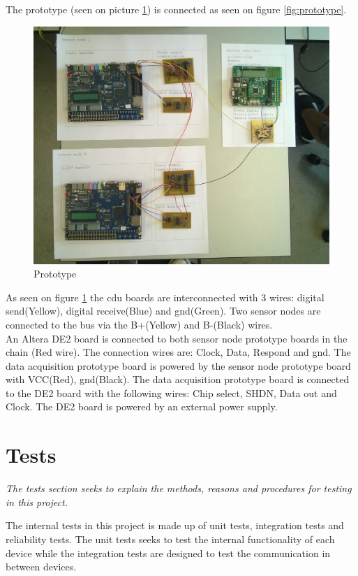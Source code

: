 The prototype (seen on picture \ref{pic:prototype}) is connected as seen on figure \ref{fig:prototype}.
\begin{figure}[H]
	\centering
	\includegraphics[width=1\textwidth]{billeder/11projectdescription/prototype}
	\caption{Prototype}
	\label{pic:prototype}
\end{figure}
As seen on figure \ref{pic:prototype} the cdu boards are interconnected with 3 wires: digital send(Yellow), digital receive(Blue) and gnd(Green). Two sensor nodes are connected to the bus via the B+(Yellow) and B-(Black) wires.\\
An Altera DE2 board is connected to both sensor node prototype boards in the chain (Red wire). The connection wires are: Clock, Data, Respond and gnd. The data acquisition prototype board is powered by the sensor node prototype board with VCC(Red), gnd(Black). The data acquisition prototype board is connected to the DE2 board with the following wires: Chip select, SHDN, Data out and Clock. The DE2 board is powered by an external power supply.



\section{Tests}
\textit{The tests section seeks to explain the methods, reasons and procedures for testing in this project.}

The internal tests in this project is made up of unit tests, integration tests and reliability tests. The unit tests seeks to test the internal functionality of each device while the integration tests are designed to test the communication in between devices.

